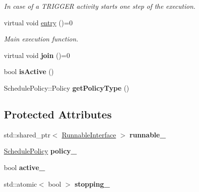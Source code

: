 \begin{DoxyCompactItemize}
\begin{DoxyCompactList}\small\item\em In case of a T\+R\+I\+G\+G\+E\+R activity starts one step of the execution. \end{DoxyCompactList}\item 
\hypertarget{classcoco_1_1_activity_a8a1182e9e8649223df1e0ec4e3648395}{}virtual void \hyperlink{classcoco_1_1_activity_a8a1182e9e8649223df1e0ec4e3648395}{entry} ()=0\label{classcoco_1_1_activity_a8a1182e9e8649223df1e0ec4e3648395}

\begin{DoxyCompactList}\small\item\em Main execution function. \end{DoxyCompactList}\item 
\hypertarget{classcoco_1_1_activity_acb7b44f9634619d29fcf8c8d39a09044}{}virtual void {\bfseries join} ()=0\label{classcoco_1_1_activity_acb7b44f9634619d29fcf8c8d39a09044}

\item 
\hypertarget{classcoco_1_1_activity_aca34cad2b6211a66efe5bbdf4db5aa44}{}bool {\bfseries is\+Active} ()\label{classcoco_1_1_activity_aca34cad2b6211a66efe5bbdf4db5aa44}

\item 
\hypertarget{classcoco_1_1_activity_a9c2f3c05e3416e4617496de06c83a00b}{}Schedule\+Policy\+::\+Policy {\bfseries get\+Policy\+Type} ()\label{classcoco_1_1_activity_a9c2f3c05e3416e4617496de06c83a00b}

\end{DoxyCompactItemize}
\subsection*{Protected Attributes}
\begin{DoxyCompactItemize}
\item 
\hypertarget{classcoco_1_1_activity_a5f2a9c45be825f79905581e237b1bcbd}{}std\+::shared\+\_\+ptr$<$ \hyperlink{classcoco_1_1_runnable_interface}{Runnable\+Interface} $>$ {\bfseries runnable\+\_\+}\label{classcoco_1_1_activity_a5f2a9c45be825f79905581e237b1bcbd}

\item 
\hypertarget{classcoco_1_1_activity_a75a9fe827a532ab36696487b0ca3d166}{}\hyperlink{structcoco_1_1_schedule_policy}{Schedule\+Policy} {\bfseries policy\+\_\+}\label{classcoco_1_1_activity_a75a9fe827a532ab36696487b0ca3d166}

\item 
\hypertarget{classcoco_1_1_activity_aef80c256f45b789d987673a4f350907e}{}bool {\bfseries active\+\_\+}\label{classcoco_1_1_activity_aef80c256f45b789d987673a4f350907e}

\item 
\hypertarget{classcoco_1_1_activity_ac7e15c803c0f74c88ac5ae1f489ee9f3}{}std\+::atomic$<$ bool $>$ {\bfseries stopping\+\_\+}\label{classcoco_1_1_activity_ac7e15c803c0f74c88ac5ae1f489ee9f3}

\end{DoxyCompactItemize}


